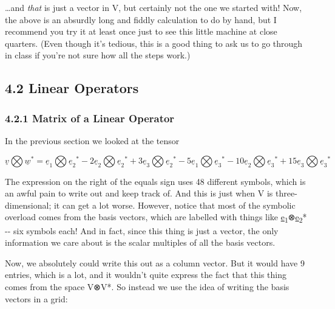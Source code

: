 \documentclass[oneside,english]{amsbook}
\numberwithin{section}{chapter}
\theoremstyle{plain}
\theoremstyle{definition}
\begin{document}
\ldots and \emph{that} is just a vector in V, but certainly not the one
we started with! Now, the above is an absurdly long and fiddly
calculation to do by hand, but I recommend you try it at least once just
to see this little machine at close quarters. (Even though it's tedious,
this is a good thing to ask us to go through in class if you're not sure
how all the steps work.)

\subsection{4.2 Linear Operators}\label{linear-operators-1}

\subsubsection{4.2.1 Matrix of a Linear
	Operator}\label{matrix-of-a-linear-operator}

In the previous section we looked at the tensor

\[\underline{v}\bigotimes{\underline{w}}^{*} = {\underline{e}}_{1}\bigotimes{{\underline{e}}_{2}}^{*} - 2{\underline{e}}_{2}\bigotimes{{\underline{e}}_{2}}^{*} + 3{\underline{e}}_{3}\bigotimes{{\underline{e}}_{2}}^{*} - 5{\underline{e}}_{1}\bigotimes{{\underline{e}}_{3}}^{*} - 10{\underline{e}}_{2}\bigotimes{{\underline{e}}_{3}}^{*} + 15{\underline{e}}_{3}\bigotimes{{\underline{e}}_{3}}^{*}\]

The expression on the right of the equals sign uses 48 different
symbols, which is an awful pain to write out and keep track of. And this
is just when V is three-dimensional; it can get a lot worse. However,
notice that most of the symbolic overload comes from the basis vectors,
which are labelled with things like
\ul{e}\textsubscript{1}⊗\ul{e}\textsubscript{2}* -\/- six symbols each!
And in fact, since this thing is just a vector, the only information we
care about is the scalar multiples of all the basis vectors.

Now, we absolutely could write this out as a column vector. But it would
have 9 entries, which is a lot, and it wouldn't quite express the fact
that this thing comes from the space V⊗V*. So instead we use the idea of
writing the basis vectors in a grid:
\end{document}
